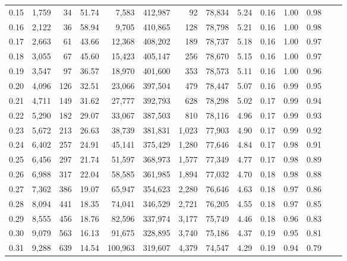 \begin{tabular}{rrrrrrrrrrrrrr}
0.15 &   1,759 &     34 &   51.74 &    7,583 &  412,987 &      92 &  78,834 &  5.24 &  0.16 &  1.00 &      0.98 \\
0.16 &   2,122 &     36 &   58.94 &    9,705 &  410,865 &     128 &  78,798 &  5.21 &  0.16 &  1.00 &      0.98 \\
0.17 &   2,663 &     61 &   43.66 &   12,368 &  408,202 &     189 &  78,737 &  5.18 &  0.16 &  1.00 &      0.97 \\
0.18 &   3,055 &     67 &   45.60 &   15,423 &  405,147 &     256 &  78,670 &  5.15 &  0.16 &  1.00 &      0.97 \\
0.19 &   3,547 &     97 &   36.57 &   18,970 &  401,600 &     353 &  78,573 &  5.11 &  0.16 &  1.00 &      0.96 \\
0.20 &   4,096 &    126 &   32.51 &   23,066 &  397,504 &     479 &  78,447 &  5.07 &  0.16 &  0.99 &      0.95 \\
0.21 &   4,711 &    149 &   31.62 &   27,777 &  392,793 &     628 &  78,298 &  5.02 &  0.17 &  0.99 &      0.94 \\
0.22 &   5,290 &    182 &   29.07 &   33,067 &  387,503 &     810 &  78,116 &  4.96 &  0.17 &  0.99 &      0.93 \\
0.23 &   5,672 &    213 &   26.63 &   38,739 &  381,831 &   1,023 &  77,903 &  4.90 &  0.17 &  0.99 &      0.92 \\
0.24 &   6,402 &    257 &   24.91 &   45,141 &  375,429 &   1,280 &  77,646 &  4.84 &  0.17 &  0.98 &      0.91 \\
0.25 &   6,456 &    297 &   21.74 &   51,597 &  368,973 &   1,577 &  77,349 &  4.77 &  0.17 &  0.98 &      0.89 \\
0.26 &   6,988 &    317 &   22.04 &   58,585 &  361,985 &   1,894 &  77,032 &  4.70 &  0.18 &  0.98 &      0.88 \\
0.27 &   7,362 &    386 &   19.07 &   65,947 &  354,623 &   2,280 &  76,646 &  4.63 &  0.18 &  0.97 &      0.86 \\
0.28 &   8,094 &    441 &   18.35 &   74,041 &  346,529 &   2,721 &  76,205 &  4.55 &  0.18 &  0.97 &      0.85 \\
0.29 &   8,555 &    456 &   18.76 &   82,596 &  337,974 &   3,177 &  75,749 &  4.46 &  0.18 &  0.96 &      0.83 \\
0.30 &   9,079 &    563 &   16.13 &   91,675 &  328,895 &   3,740 &  75,186 &  4.37 &  0.19 &  0.95 &      0.81 \\
0.31 &   9,288 &    639 &   14.54 &  100,963 &  319,607 &   4,379 &  74,547 &  4.29 &  0.19 &  0.94 &      0.79 \\

\end{tabular}

